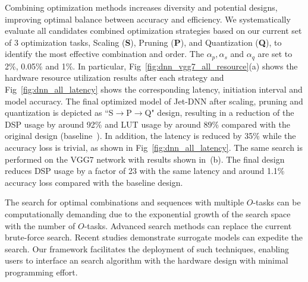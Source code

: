 Combining optimization methods increases diversity and potential designs, improving optimal balance between accuracy and efficiency. We systematically evaluate all candidates combined optimization strategies based on our current set of 3 optimization tasks, Scaling (\textbf{S}), Pruning (\textbf{P}), and Quantization (\textbf{Q}), to identify the most effective combination and order. The $\alpha_p, \alpha_s$ and $\alpha_q$ are set to 2\%, 0.05\% and 1\%. 
In particular, Fig~\ref{fig:dnn_vgg7_all_resource}(a) shows the hardware resource utilization results after each strategy and Fig~\ref{fig:dnn_all_latency} shows the corresponding latency, initiation interval and model accuracy. The final optimized model of Jet-DNN after scaling, pruning and quantization is depicted as ``S$\rightarrow$P$\rightarrow$Q" design, resulting in a reduction of the DSP usage by around 92\% and LUT usage by around 89\% compared with the original design (baseline~\cite{duarte2018fast, que2023metaml}). In addition, the latency is reduced by 35\% while the accuracy loss is trivial, as shown in Fig~\ref{fig:dnn_all_latency}. 
The same search is performed on the VGG7 network with results shown in~(b). The final design reduces DSP usage by a factor of 23 with the same latency and around 1.1\% accuracy loss compared with the baseline design. 

The search for optimal combinations and sequences with multiple $O$-tasks can be computationally demanding due to the exponential growth of the search space with the number of $O$-tasks. Advanced search methods can replace the current brute-force search. 
Recent studies \cite{kurek2016knowledge, ferretti2022graph, wu2021ironman} 
demonstrate surrogate models can expedite the search. 
Our framework facilitates the deployment of such techniques, enabling users to interface an search algorithm with the hardware design with minimal programming effort.



